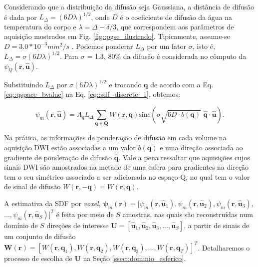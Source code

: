 \documentclass[
    12pt,                %
    oneside,            %
    a4paper,            %
    english,            %
    french,                %
    spanish,            %
    brazil                %
    ]{abntex2}
\begin{document}
Considerando que a distribuição da difusão seja Gaussiana, a distância de difusão é dada por $L_{\Delta}=(6D\lambda)^{1/2}$, onde $D$ é o coeficiente de difusão da água na temperatura do corpo e $\lambda = \Delta - \delta/3$, que correspondem aos parâmetros de aquisição mostrados em Fig. \ref{fig::pgse_ilustrado}. 
Tipicamente, assume-se $D = 3.0*10^{-3} mm^2/s$ \cite{yeh2019_DSI}. Podemos ponderar $L_{\Delta}$ por um fator $\sigma$, isto é, $L_{\Delta} = \sigma(6D\lambda)^{1/2}$. Para $\sigma$ = 1.3, $80\%$ da difusão é considerada no cômputo da $\psi_Q(\mathbf{r}, \mathbf{\hat{u}})$.

Substituindo $L_{\Delta}$ por $\sigma(6D\lambda)^{1/2}$ e trocando $\mathbf{q}$ de acordo com a Eq. \ref{eq::qspace_bvalue} na Eq. \ref{eq::sdf_discrete_1}, obtemos:



\begin{equation}
\label{eq::sdf_discrete_2}
    \psi_m(\mathbf{r}, \mathbf{\hat{u}}) =
    A_qL_{\Delta}\sum_{\mathbf{q} \in \mathbf{Q}}W(\mathbf{r}, \mathbf{q})\text{sinc}(\sigma \sqrt{6D\cdot b(\mathbf{q})}\,\,  \mathbf{\hat{q}}\cdot\mathbf{\hat{u}}) .
\end{equation}

 Na prática, as informações de ponderação de difusão em cada volume na aquisição DWI estão associadas a um valor $b(\mathbf{q})$ e uma direção associada ao gradiente de ponderação de difusão $\mathbf{\hat{q}}$. Vale a pena ressaltar que aquisições cujos sinais DWI são amostrados na metade de uma esfera para gradientes na direção tem o seu simétrico associado a ser adicionado no espaço-Q, no qual tem o valor de sinal de difusão $W(\mathbf{r}, -\mathbf{q}) = W(\mathbf{r}, \mathbf{q})$.

A estimativa da SDF por \textit{voxel}, 
$\boldsymbol{\psi}_m(\mathbf{r}) = [
\psi_m(\mathbf{r}, \mathbf{\hat{u}}_1), 
\psi_m(\mathbf{r}, \mathbf{\hat{u}}_2), 
\psi_m(\mathbf{r}, \mathbf{\hat{u}}_3),$
$ ..., 
\psi_m(\mathbf{r}, \mathbf{\hat{u}}_S)
]^T$
é feita por meio de $S$ amostras, nas quais são reconstruídas num domínio de $S$ direções de interesse $\mathbf{U} = [
\mathbf{\hat{u}}_1, 
\mathbf{\hat{u}}_2, 
\mathbf{\hat{u}}_3, \dots, 
\mathbf{\hat{u}}_S 
]$, a partir de sinais de um conjunto de difusão $\mathbf{W}(\mathbf{r}) = [
W(\mathbf{r},\mathbf{q}_1),
W(\mathbf{r},\mathbf{q}_2),
W(\mathbf{r},\mathbf{q}_3), \dots ,
W(\mathbf{r},\mathbf{q}_T)
]^T$. Detalharemos o processo de escolha de $\mathbf{U}$ na Seção \ref{ssec::dominio_esferico}.
\end{document}
